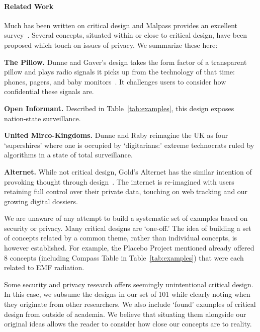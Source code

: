 \paragraph{Related Work}

Much has been written on critical design and Malpass provides an excellent survey~\cite{Mal17}. Several concepts, situated within or close to critical design, have been proposed which touch on issues of privacy. We summarize these here: 

\begin{compactlist}
\item \textbf{The Pillow.} Dunne and Gaver's design takes the form factor of a transparent pillow and plays radio signals it picks up from the technology of that time: \eg phones, pagers, and baby monitors~\cite{DuGa97}. It challenges users to consider how confidential these signals are.  
\item \textbf{Open Informant.} Described in Table~\ref{tab:examples}, this design exposes nation-state surveillance.
\item \textbf{United Mirco-Kingdoms.} Dunne and Raby reimagine the UK as four `supershires' where one is occupied by `digitarians:' extreme technocrats ruled by algorithms in a state of total surveillance.  
\item \textbf{Alternet.} While not critical design, Gold's Alternet has the similar intention of provoking thought through design~\cite{Gol14}. The internet is re-imagined with users retaining full control over their private data, touching on web tracking and our growing digital dossiers. 
\end{compactlist}

We are unaware of any attempt to build a systematic set of examples based on security or privacy. Many critical designs are `one-off.' The idea of building a set of concepts related by a common theme, rather than individual concepts, is however established. For example, the Placebo Project mentioned already offered 8 concepts  (including Compass Table in Table~\ref{tab:examples}) that were each related to EMF radiation. 

Some security and privacy research offers seemingly unintentional critical design. In this case, we subsume the designs in our set of 101 while clearly noting when they originate from other researchers. We also include `found' examples of critical design from outside of academia. We believe that situating them alongside our original ideas allows the reader to consider how close our concepts are to reality. 

